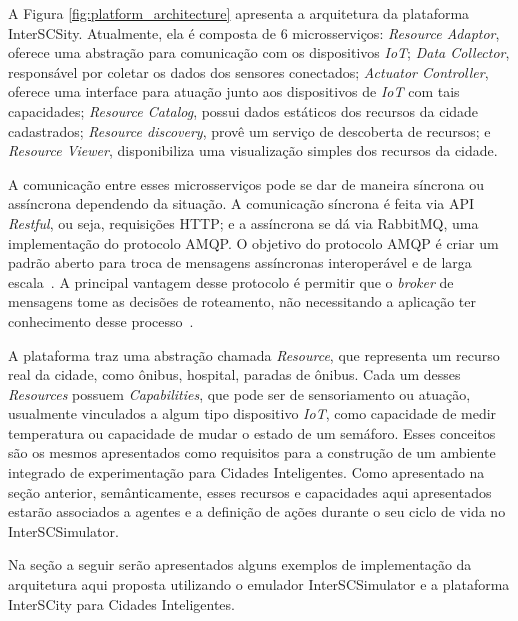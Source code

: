 A Figura \ref{fig:platform_architecture} apresenta a arquitetura da plataforma InterSCSity.
Atualmente, ela é composta de 6 microsserviços:
\textit{Resource Adaptor}, oferece uma abstração para comunicação com os dispositivos \textit{IoT};
\textit{Data Collector}, responsável por coletar os dados dos sensores conectados;
\textit{Actuator Controller}, oferece uma interface para atuação junto aos dispositivos de \textit{IoT} com tais capacidades;
\textit{Resource Catalog}, possui dados estáticos dos recursos da cidade cadastrados;
\textit{Resource discovery}, provê um serviço de descoberta de recursos;
e \textit{Resource Viewer}, disponibiliza uma visualização simples dos recursos da cidade. 


A comunicação entre esses microsserviços pode se dar de maneira síncrona ou assíncrona dependendo da situação.
A comunicação síncrona é feita via API \textit{Restful}, ou seja, requisições HTTP; e a assíncrona se dá via RabbitMQ, uma implementação do protocolo AMQP.
O objetivo do protocolo AMQP é criar um padrão aberto para troca de mensagens assíncronas interoperável e de larga escala~\cite{vinoski_2006}.
A principal vantagem desse protocolo é permitir que o \textit{broker} de mensagens tome as decisões de roteamento, não necessitando a aplicação ter conhecimento
desse processo~\cite{vinoski_2006}.

A plataforma traz uma abstração chamada \textit{Resource}, que representa um recurso real da cidade, como ônibus, hospital, paradas de ônibus.
Cada um desses \textit{Resources} possuem \textit{Capabilities}, que pode ser de sensoriamento ou atuação, usualmente vinculados a algum tipo dispositivo \textit{IoT},
como capacidade de medir temperatura ou capacidade de mudar o estado de um semáforo.
Esses conceitos são os mesmos apresentados como requisitos para a construção de um ambiente integrado de experimentação para Cidades Inteligentes.
Como apresentado na seção anterior, semânticamente, esses recursos e capacidades aqui apresentados estarão associados a agentes e a definição de ações durante o seu
ciclo de vida no InterSCSimulator.

Na seção a seguir serão apresentados alguns exemplos de implementação da arquitetura aqui proposta utilizando o emulador InterSCSimulator e a plataforma InterSCity
para Cidades Inteligentes.

